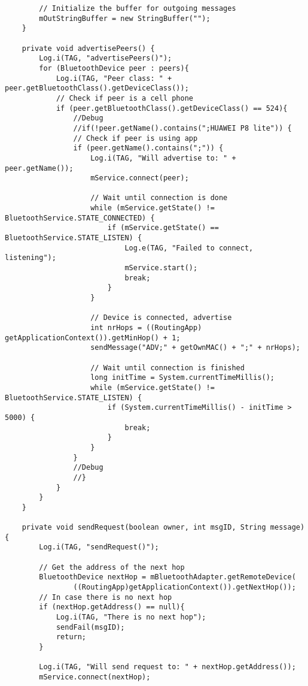\begin{verbatim}
        // Initialize the buffer for outgoing messages
        mOutStringBuffer = new StringBuffer("");
    }

    private void advertisePeers() {
        Log.i(TAG, "advertisePeers()");
        for (BluetoothDevice peer : peers){
            Log.i(TAG, "Peer class: " + peer.getBluetoothClass().getDeviceClass());
            // Check if peer is a cell phone
            if (peer.getBluetoothClass().getDeviceClass() == 524){
                //Debug
                //if(!peer.getName().contains(";HUAWEI P8 lite")) {
                // Check if peer is using app
                if (peer.getName().contains(";")) {
                    Log.i(TAG, "Will advertise to: " + peer.getName());
                    mService.connect(peer);

                    // Wait until connection is done
                    while (mService.getState() != BluetoothService.STATE_CONNECTED) {
                        if (mService.getState() == BluetoothService.STATE_LISTEN) {
                            Log.e(TAG, "Failed to connect, listening");
                            mService.start();
                            break;
                        }
                    }

                    // Device is connected, advertise
                    int nrHops = ((RoutingApp) getApplicationContext()).getMinHop() + 1;
                    sendMessage("ADV;" + getOwnMAC() + ";" + nrHops);

                    // Wait until connection is finished
                    long initTime = System.currentTimeMillis();
                    while (mService.getState() != BluetoothService.STATE_LISTEN) {
                        if (System.currentTimeMillis() - initTime > 5000) {
                            break;
                        }
                    }
                }
                //Debug
                //}
            }
        }
    }

    private void sendRequest(boolean owner, int msgID, String message) {
        Log.i(TAG, "sendRequest()");

        // Get the address of the next hop
        BluetoothDevice nextHop = mBluetoothAdapter.getRemoteDevice(
                ((RoutingApp)getApplicationContext()).getNextHop());
        // In case there is no next hop
        if (nextHop.getAddress() == null){
            Log.i(TAG, "There is no next hop");
            sendFail(msgID);
            return;
        }

        Log.i(TAG, "Will send request to: " + nextHop.getAddress());
        mService.connect(nextHop);


\end{verbatim}
